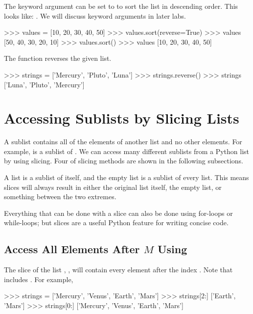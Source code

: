 \documentclass[11pt]{cselabheader}
\begin{document}
The keyword argument  can be set to
 to sort the list in descending order.
This looks like: .
We will discuss keyword arguments in later labs.

\begin{pyconcode}
>>> values = [10, 20, 30, 40, 50]
>>> values.sort(reverse=True)
>>> values
[50, 40, 30, 20, 10]
>>> values.sort()
>>> values
[10, 20, 30, 40, 50]

\end{pyconcode}

The  function reverses the given list.

\begin{pyconcode}
>>> strings = ['Mercury', 'Pluto', 'Luna']
>>> strings.reverse()
>>> strings
['Luna', 'Pluto', 'Mercury']

\end{pyconcode}

\section{Accessing Sublists by Slicing Lists}
A sublist contains all of the elements of another list and no other elements.
For example, \pythoninline{[1,2,3]} is a sublist of \pythoninline{[1,2,3,4,5]}.
We can access many different sublists from a Python list by
using slicing. Four of slicing methods are shown in the following
subsections.

A list is a sublist of itself, and the empty list \pythonindex{[]} is
a sublist of every list. This means slices will always result in
either the original list itself, the empty list, or something between
the two extremes.

Everything that can be done with a slice can also be done using
for-loops or while-loops; but slices are a useful Python feature
for writing concise code.

\subsection{\texorpdfstring%
  {Access All Elements After $M$ Using \pythoninline{[M:]}}
  {Access All Elements After M Using {[}M:{]}}}

The slice of the list , ,
will contain every element after the index .
Note that  includes .
For example,

\begin{pyconcode}
>>> strings = ['Mercury', 'Venus', 'Earth', 'Mars']
>>> strings[2:]
['Earth', 'Mars']
>>> strings[0:]
['Mercury', 'Venus', 'Earth', 'Mars']

\end{pyconcode}
\end{document}
